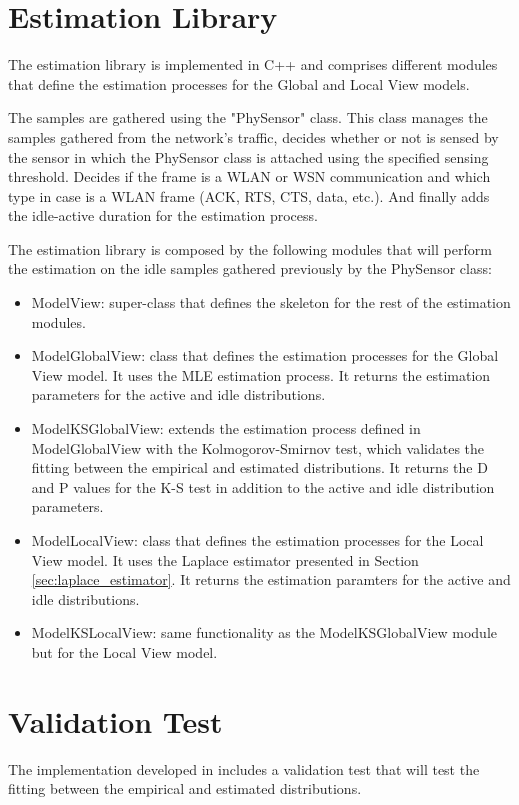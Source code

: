 \section{Estimation Library} \label{sec:simulation_estimation}
The estimation library is implemented in C++ and comprises different modules that define the estimation processes for the Global and Local View models.

The samples are gathered using the "PhySensor" class. This class manages the samples gathered from the network's traffic, decides whether or not is sensed by the sensor in which the PhySensor class is attached using the specified sensing threshold. Decides if the frame is a \acs{WLAN} or \acs{WSN} communication and which type in case is a \acs{WLAN} frame (\acs{ACK}, \acs{RTS}, \acs{CTS}, data, etc.). And finally adds the idle-active duration for the estimation process.

The estimation library is composed by the following modules that will perform the estimation on the idle samples gathered previously by the PhySensor class:

\begin{itemize}
	\item ModelView: super-class that defines the skeleton for the rest of the estimation modules.
	\item ModelGlobalView: class that defines the estimation processes for the Global View model. It uses the \acs{MLE} estimation process. It returns the estimation parameters for the active and idle distributions.
	\item ModelKSGlobalView: extends the estimation process defined in ModelGlobalView with the Kolmogorov-Smirnov test, which validates the fitting between the empirical and estimated distributions. It returns the D and P values for the \acs{K-S} test in addition to the active and idle distribution parameters.
	\item ModelLocalView: class that defines the estimation processes for the Local View model. It uses the Laplace estimator presented in Section \ref{sec:laplace_estimator}.  It returns the estimation paramters for the active and idle distributions.
	\item ModelKSLocalView: same functionality as the ModelKSGlobalView module but for the Local View model.
\end{itemize}


\section{Validation Test} \label{sec:simulation_validation}
The implementation developed in \cite{marcello-thesis} includes a validation test that will test the fitting between the empirical and estimated distributions.

